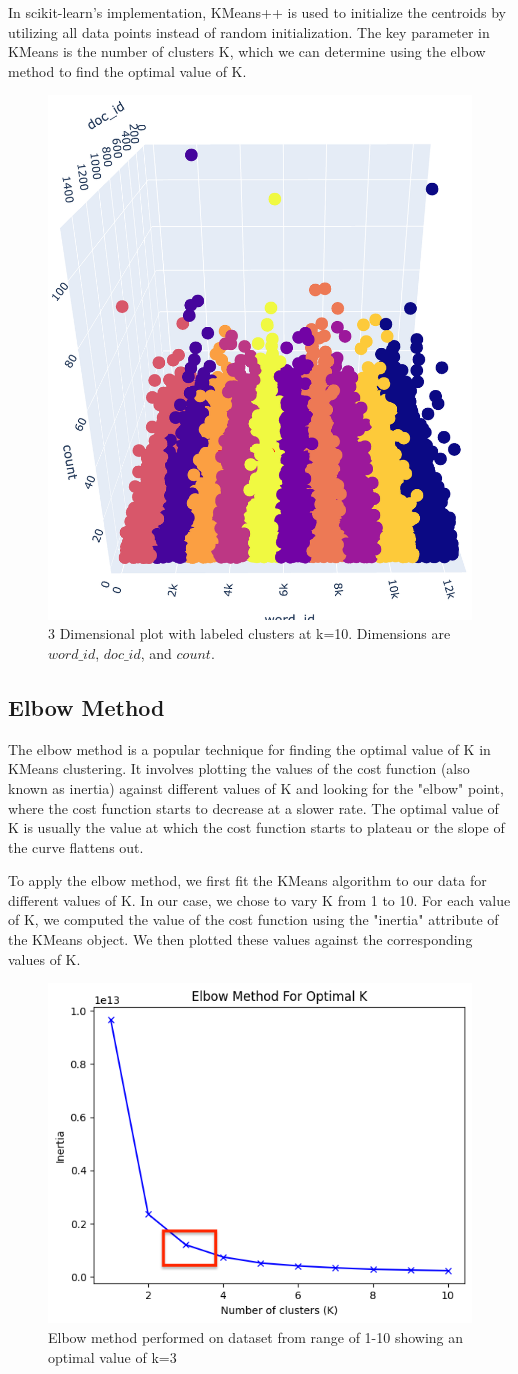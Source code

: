 \documentclass{article}
\begin{document}
In scikit-learn's implementation, KMeans++ is used to initialize the centroids by utilizing all data points instead of random initialization. The key parameter in KMeans is the number of clusters K, which we can determine using the elbow method to find the optimal value of K.

\begin{figure}[h]
    \centering
    \includegraphics[width=.5\textwidth]{figs/k10.png}
    \caption{3 Dimensional plot with labeled clusters at k=10. Dimensions are $word\_id$, $doc\_id$, and $count$.}
\end{figure}

\subsection{Elbow Method}
The elbow method is a popular technique for finding the optimal value of K in KMeans clustering\cite{satishgunjal-kmeans-tutorial}. It involves plotting the values of the cost function (also known as inertia) against different values of K and looking for the "elbow" point, where the cost function starts to decrease at a slower rate. The optimal value of K is usually the value at which the cost function starts to plateau or the slope of the curve flattens out.

To apply the elbow method, we first fit the KMeans algorithm to our data for different values of K. In our case, we chose to vary K from 1 to 10. For each value of K, we computed the value of the cost function using the "inertia" attribute of the KMeans object. We then plotted these values against the corresponding values of K.



\begin{figure}[h]
    \centering
    \includegraphics[width=.4\textwidth]{figs/elbow.png}
    \caption{Elbow method performed on dataset from range of 1-10 showing an optimal value of k=3}
\end{figure}
\end{document}
